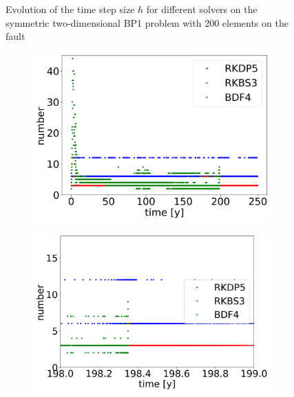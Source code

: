 \documentclass{report}
\begin{document}
\begin{figure}[H]
\begin{subfigure}{0.32\textwidth}
    \end{subfigure}
    \caption{Evolution of the time step size $h$ for different solvers on the symmetric two-dimensional BP1 problem with 200 elements on the fault}
    \label{fig:timeEvolutionTANDEM_DT}
\end{figure}


\begin{figure}[H]
    \centering
    \begin{subfigure}{0.32\textwidth}
    	\centering
    	\includegraphics[width=1\textwidth]{images/TANDEMtimeEvolutionRHSall.png}
    \end{subfigure}
    \begin{subfigure}{0.32\textwidth}
    	\centering
    	\includegraphics[width=1\textwidth]{images/TANDEMtimeEvolutionRHSsurroundings.png}

\end{subfigure}
\end{figure}
\end{document}
